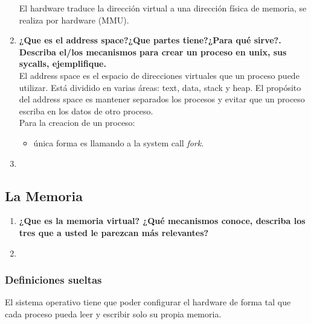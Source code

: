 \documentclass[../main.tex]{subfiles}
\begin{document}
\begin{enumerate}
                El hardware traduce la dirección virtual a una dirección física de memoria, se realiza por hardware (MMU).

            \item \textbf{¿Que es el address space?¿Que partes tiene?¿Para qué sirve?. Describa el/los mecanismos para crear un proceso en unix, sus sycalls, ejemplifique.}\\
                El address space es el espacio de direcciones virtuales que un proceso puede utilizar.  Está dividido en varias áreas: text, data, stack y heap.
                El propósito del address space es mantener separados los procesos y evitar que un proceso escriba en los datos de otro proceso.\\
                
                Para la creacion de un proceso:
                \begin{itemize}
                    \item única forma es llamando a la system call \textit{fork}.
                \end{itemize}
            \item 
            
        \end{enumerate}
    \subsection*{La Memoria}
        \begin{enumerate}
            \item \textbf{¿Que es la memoria virtual? ¿Qué mecanismos conoce, describa los tres que a usted le parezcan más relevantes?}\\
            
            \item 
        \end{enumerate}
    \subsubsection*{Definiciones sueltas}
        El sistema operativo tiene que poder configurar el hardware de forma tal que cada proceso pueda leer y escribir solo su propia memoria.
\end{document}
